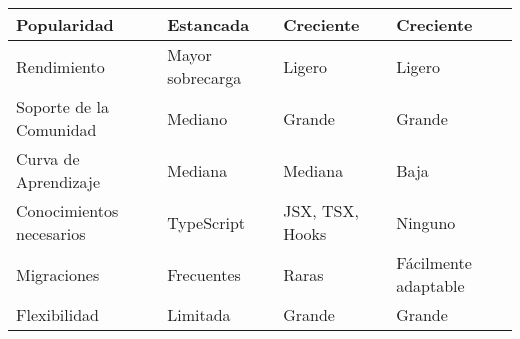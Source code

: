 \begin{longtable}{|p{5cm}|p{3cm}|p{3cm}|p{3cm}|}
    \hline \hline
    \endlastfoot
    Popularidad                                    & Estancada                              & Creciente                              & Creciente                                                                          \\\hline
    Rendimiento                                    & Mayor sobrecarga                       & Ligero                                 & Ligero                                                                             \\\hline
    Soporte de la Comunidad                        & Mediano                                & Grande                                 & Grande                                                                             \\\hline
    Curva de Aprendizaje                           & Mediana                                & Mediana                                & Baja                                                                               \\\hline
    Conocimientos necesarios                       & TypeScript                             & JSX, TSX, Hooks                        & Ninguno                                                                            \\\hline
    Migraciones                                    & Frecuentes                             & Raras                                  & Fácilmente adaptable                                                               \\\hline
    Flexibilidad                                   & Limitada                               & Grande                                 & Grande                                                                             \\
\end{longtable}